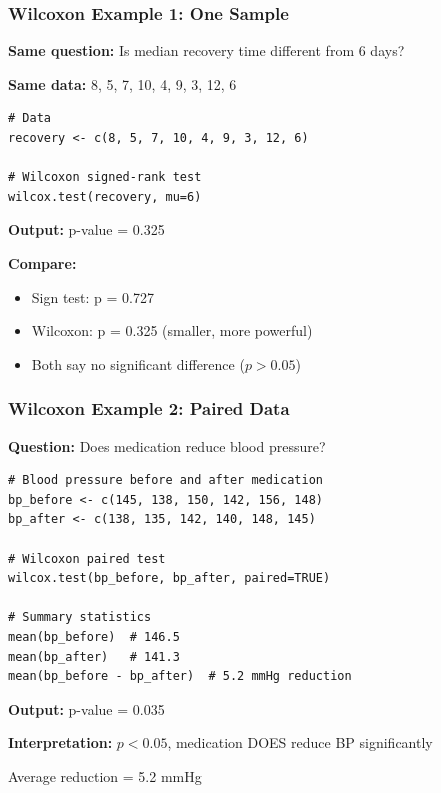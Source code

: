 \documentclass{beamer}
\begin{document}
\begin{frame}[fragile]
\frametitle{Wilcoxon Example 1: One Sample}
\textbf{Same question:} Is median recovery time different from 6 days?

\vspace{0.3cm}
\textbf{Same data:} 8, 5, 7, 10, 4, 9, 3, 12, 6

\vspace{0.3cm}
\begin{small}
\begin{verbatim}
# Data
recovery <- c(8, 5, 7, 10, 4, 9, 3, 12, 6)

# Wilcoxon signed-rank test
wilcox.test(recovery, mu=6)
\end{verbatim}
\end{small}

\textbf{Output:} p-value = 0.325

\vspace{0.3cm}
\textbf{Compare:}
\begin{itemize}
\item Sign test: p = 0.727
\item Wilcoxon: p = 0.325 (smaller, more powerful)
\item Both say no significant difference ($p > 0.05$)
\end{itemize}
\end{frame}

\begin{frame}[fragile]
\frametitle{Wilcoxon Example 2: Paired Data}
\textbf{Question:} Does medication reduce blood pressure?

\vspace{0.3cm}
\begin{small}
\begin{verbatim}
# Blood pressure before and after medication
bp_before <- c(145, 138, 150, 142, 156, 148)
bp_after <- c(138, 135, 142, 140, 148, 145)

# Wilcoxon paired test
wilcox.test(bp_before, bp_after, paired=TRUE)

# Summary statistics
mean(bp_before)  # 146.5
mean(bp_after)   # 141.3
mean(bp_before - bp_after)  # 5.2 mmHg reduction
\end{verbatim}
\end{small}

\textbf{Output:} p-value = 0.035

\textbf{Interpretation:} $p < 0.05$, medication DOES reduce BP significantly

Average reduction = 5.2 mmHg
\end{frame}
\end{document}
